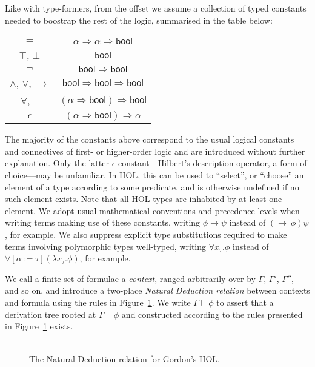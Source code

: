\documentclass[a4paper, UKenglish, cleveref, autoref, thm-restate]{lipics-v2021}
\newcommand{\fall}[1]{\forall{#1}.}
\newcommand{\lam}[1]{\lambda{#1}.}
\begin{document}
Like with type-formers, from the offset we assume a collection of typed constants needed to boostrap the rest of the logic, summarised in the table below:
\begin{center}
\begin{tabular}{cc}
$=$ & $\alpha \Rightarrow \alpha \Rightarrow \mathsf{bool}$ \\
$\top$, $\bot$ & $\mathsf{bool}$ \\
$\neg$ & $\mathsf{bool} \Rightarrow \mathsf{bool}$ \\
$\wedge$, $\vee$, $\longrightarrow$ & $\mathsf{bool} \Rightarrow \mathsf{bool} \Rightarrow \mathsf{bool}$ \\
$\forall$, $\exists$ & $(\alpha \Rightarrow \mathsf{bool}) \Rightarrow \mathsf{bool}$ \\
$\epsilon$ & $(\alpha \Rightarrow \mathsf{bool}) \Rightarrow \mathsf{\alpha}$
\end{tabular}
\end{center}
The majority of the constants above correspond to the usual logical constants and connectives of first- or higher-order logic and are introduced without further explanation.
Only the latter $\epsilon$ constant---Hilbert's description operator, a form of choice---may be unfamiliar.
In HOL, this can be used to ``select'', or ``choose'' an element of a type according to some predicate, and is otherwise undefined if no such element exists.
Note that all HOL types are inhabited by at least one element.
We adopt usual mathematical conventions and precedence levels when writing terms making use of these constants, writing $\phi \longrightarrow \psi$ instead of $(\longrightarrow\ \phi)\psi$, for example.
We also suppress explicit type substitutions required to make terms involving polymorphic types well-typed, writing $\fall{x_\tau}\phi$ instead of $\forall[\alpha := \tau](\lam{x_\tau}\phi)$, for example.

We call a finite set of formulae a \emph{context}, ranged arbitrarily over by $\Gamma$, $\Gamma'$, $\Gamma''$, and so on, and introduce a two-place \emph{Natural Deduction relation} between contexts and formula using the rules in Figure~\ref{fig.natural.deduction}.
We write $\Gamma \vdash \phi$ to assert that a derivation tree rooted at $\Gamma \vdash \phi$ and constructed according to the rules presented in Figure~\ref{fig.natural.deduction} exists.

\begin{figure}
\begin{gather*}
\end{gather*}
\caption{The Natural Deduction relation for Gordon's HOL.}
\label{fig.natural.deduction}
\end{figure}
\end{document}
